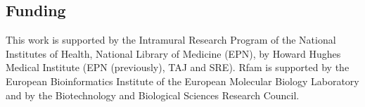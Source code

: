 \documentclass[custom,landscape,final,30pt,plainboxedsections]{sciposter-titleskipsmall}
\begin{document}
\begin{multicols}{3}
\section*{Funding}
\begin{footnotesize}
This work is supported by the Intramural Research Program of the
National Institutes of Health, National Library of Medicine (EPN), 
by Howard Hughes Medical Institute (EPN (previously), TAJ and
SRE). Rfam is supported by the European
Bioinformatics Institute of the European Molecular Biology Laboratory
and by the Biotechnology and Biological Sciences Research Council.
\end{footnotesize}


\begin{tiny}

\end{tiny}

\end{multicols}
\end{document}

